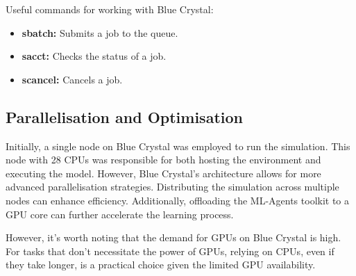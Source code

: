 Useful commands for working with Blue Crystal:

\begin{itemize}
    \item \textbf{sbatch:} Submits a job to the queue.
    \item \textbf{sacct:} Checks the status of a job.
    \item \textbf{scancel:} Cancels a job.
\end{itemize}

\subsection*{Parallelisation and Optimisation}

Initially, a single node on Blue Crystal was employed to run the simulation. This node with 28 CPUs was responsible for both hosting the environment and executing the model. However, Blue Crystal's architecture allows for more advanced parallelisation strategies. Distributing the simulation across multiple nodes can enhance efficiency. Additionally, offloading the ML-Agents toolkit to a GPU core can further accelerate the learning process.

However, it's worth noting that the demand for GPUs on Blue Crystal is high. For tasks that don't necessitate the power of GPUs, relying on CPUs, even if they take longer, is a practical choice given the limited GPU availability.

